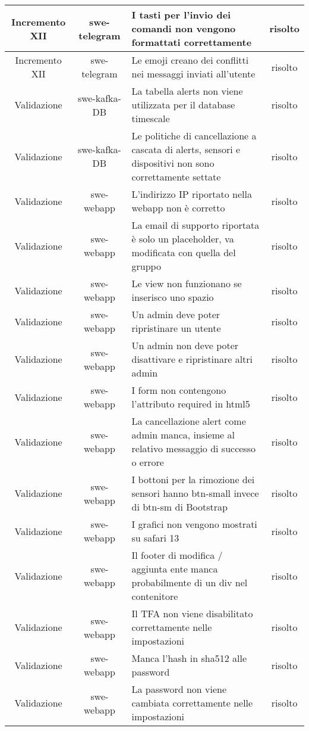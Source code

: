 \begin{center}
\begin{longtable}{|c|c|p{9.5cm}|c|}
    \hline
    Incremento XII & swe-telegram & I tasti per l'invio dei comandi non vengono formattati correttamente & risolto \\
    \hline
    Incremento XII & swe-telegram & Le emoji creano dei conflitti nei messaggi inviati all'utente & risolto \\
    \hline
    Validazione & swe-kafka-DB & La tabella alerts non viene utilizzata per il database timescale & risolto \\
    \hline
    Validazione & swe-kafka-DB & Le politiche di cancellazione a cascata di alerts, sensori e dispositivi non sono correttamente settate & risolto \\
    \hline
    Validazione & swe-webapp & L'indirizzo IP riportato nella webapp non è corretto & risolto \\
    \hline
    Validazione & swe-webapp & La email di supporto riportata è solo un placeholder, va modificata con quella del gruppo & risolto \\
    \hline
    Validazione & swe-webapp & Le view non funzionano se inserisco uno spazio & risolto \\
    \hline
    Validazione & swe-webapp & Un admin deve poter ripristinare un utente & risolto \\
    \hline
    Validazione & swe-webapp & Un admin non deve poter disattivare e ripristinare altri admin & risolto \\
    \hline
    Validazione & swe-webapp & I form non contengono l'attributo required in html5 & risolto \\
    \hline
    Validazione & swe-webapp & La cancellazione alert come admin manca, insieme al relativo messaggio di successo o errore & risolto \\
    \hline
    Validazione & swe-webapp & I bottoni per la rimozione dei sensori hanno btn-small invece di btn-sm di Bootstrap & risolto \\
    \hline
    Validazione & swe-webapp & I grafici non vengono mostrati su safari 13 & risolto \\
    \hline
    Validazione & swe-webapp & Il footer di modifica / aggiunta ente manca probabilmente di un div nel contenitore & risolto \\
    \hline
    Validazione & swe-webapp & Il TFA non viene disabilitato correttamente nelle impostazioni & risolto \\
    \hline
    Validazione & swe-webapp & Manca l'hash in sha512 alle password & risolto \\
    \hline
    Validazione & swe-webapp & La password non viene cambiata correttamente nelle impostazioni & risolto \\

\end{longtable}
\end{center}
